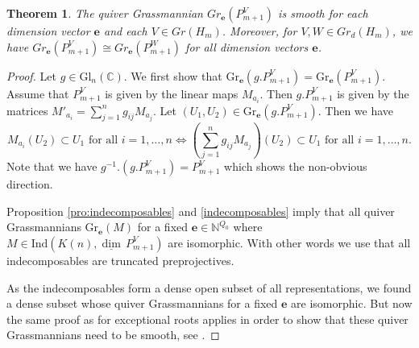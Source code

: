 \documentclass{amsart}
\newtheorem{theorem}{Theorem}[section]
\newcommand{\bfe}{\mathbf{e}}
\newcommand\udim{{\underline{\dim}\, }}
\newcommand{\Gr}{\mathrm{Gr}}
\newcommand{\Gl}{\mathrm{Gl}}
\newcommand{\Ind}{\mathrm{Ind}}
\newcommand{\CC}{\mathbb{C}}
\newcommand{\NN}{\mathbb{N}}
\begin{document}
\begin{theorem}
  The quiver Grassmannian $Gr_\bfe(P_{m+1}^V)$ is smooth for each dimension vector $\bfe$ and each $V\in Gr(H_m)$.
  Moreover, for $V,W\in Gr_d(H_m)$, we have $Gr_\bfe(P_{m+1}^V)\cong Gr_\bfe(P_{m+1}^W)$ for all dimension vectors $\bfe$.
\end{theorem}
\begin{proof}
Let $g\in\Gl_n(\CC)$. We first show that $\Gr_\bfe(g.P_{m+1}^V)=\Gr_\bfe(P_{m+1}^V)$. Assume that $P_{m+1}^V$ is given by the linear maps $M_{a_i}$. Then $g.P_{m+1}^V$ is given by the matrices $M'_{a_i}=\sum\limits_{j=1}^n g_{ij}M_{a_j}$. Let $(U_1,U_2)\in\Gr_\bfe(g.P_{m+1}^V)$. Then we have  
\[M_{a_i}(U_2)\subset U_1 \text{ for all } i=1,\ldots,n\Leftrightarrow \left(\sum\limits_{j=1}^n g_{ij}M_{a_j}\right)(U_2)\subset U_1 \text{ for all } i=1,\ldots,n.\]
Note that we have $g^{-1}.(g.P_{m+1}^V)=P_{m+1}^V$ which shows the non-obvious direction.

Proposition \ref{pro:indecomposables} and \ref{indecomposables} imply that all quiver Grassmannians $\Gr_\bfe(M)$ for a fixed $\bfe\in\NN^{Q_0}$ where $M\in\Ind(K(n),\udim P_{m+1}^V)$ are isomorphic. With other words we use that all indecomposables are truncated preprojectives.

As the indecomposables form a dense open subset of all representations, we found a dense subset whose quiver Grassmannians for a fixed $\bfe$ are isomorphic. But now the same proof as for exceptional roots applies in order to show that these quiver Grassmannians need to be smooth, see \cite[Corollary 4]{cr}.

\end{proof}
\end{document}
